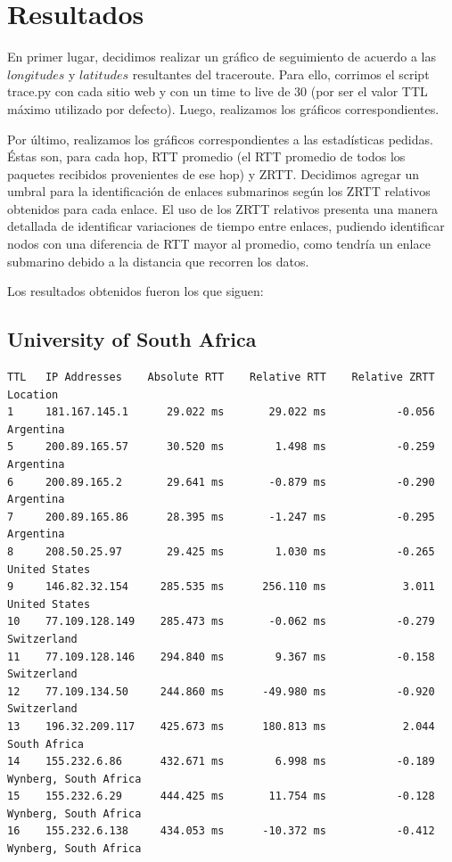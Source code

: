 \documentclass[10pt, a4paper]{article}
\begin{document}
\section{Resultados}

En primer lugar, decidimos realizar un gráfico de seguimiento de acuerdo a las $longitudes$ y $latitudes$ resultantes del traceroute. Para ello, corrimos el script trace.py con cada sitio web y con un time to live de 30 (por ser el valor TTL máximo utilizado por defecto). Luego, realizamos los gráficos correspondientes.

Por último, realizamos los gráficos correspondientes a las estadísticas pedidas. Éstas son, para cada hop, RTT promedio (el RTT promedio de todos los paquetes recibidos provenientes de ese hop) y ZRTT. Decidimos agregar un umbral para la identificación de enlaces submarinos según los ZRTT relativos obtenidos para cada enlace. El uso de los ZRTT relativos presenta una manera detallada de identificar variaciones de tiempo entre enlaces, pudiendo identificar nodos con una diferencia de RTT mayor al promedio, como tendría un enlace submarino debido a la distancia que recorren los datos. 

Los resultados obtenidos fueron los que siguen:

\subsection{University of South Africa}

\begin{verbatim}
TTL   IP Addresses    Absolute RTT    Relative RTT    Relative ZRTT  Location
1     181.167.145.1      29.022 ms       29.022 ms           -0.056  Argentina
5     200.89.165.57      30.520 ms        1.498 ms           -0.259  Argentina
6     200.89.165.2       29.641 ms       -0.879 ms           -0.290  Argentina
7     200.89.165.86      28.395 ms       -1.247 ms           -0.295  Argentina
8     208.50.25.97       29.425 ms        1.030 ms           -0.265  United States
9     146.82.32.154     285.535 ms      256.110 ms            3.011  United States
10    77.109.128.149    285.473 ms       -0.062 ms           -0.279  Switzerland
11    77.109.128.146    294.840 ms        9.367 ms           -0.158  Switzerland
12    77.109.134.50     244.860 ms      -49.980 ms           -0.920  Switzerland
13    196.32.209.117    425.673 ms      180.813 ms            2.044  South Africa
14    155.232.6.86      432.671 ms        6.998 ms           -0.189  Wynberg, South Africa
15    155.232.6.29      444.425 ms       11.754 ms           -0.128  Wynberg, South Africa
16    155.232.6.138     434.053 ms      -10.372 ms           -0.412  Wynberg, South Africa


\end{verbatim}
\end{document}
